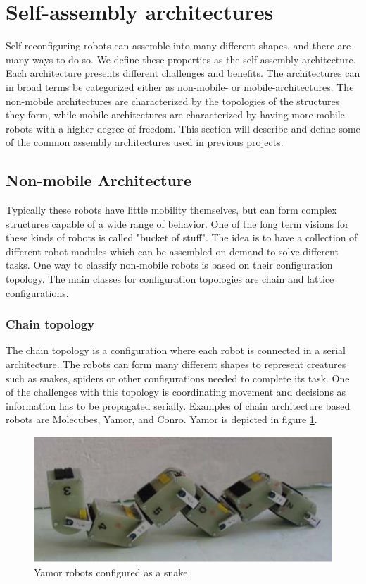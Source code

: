 \section{Self-assembly architectures}
\label{sec:sfArchitecture}
Self reconfiguring robots can assemble into many different shapes, and there are many ways to do so.
We define these properties as the self-assembly architecture.
Each architecture presents different challenges and benefits.
The architectures can in broad terms be categorized either as non-mobile- or mobile-architectures.
The non-mobile architectures are characterized by the topologies of the structures they form, while mobile architectures are characterized by having more mobile robots with a higher degree of freedom.
This section will describe and define some of the common assembly architectures used in previous projects.
\subsection{Non-mobile Architecture}
Typically these robots have little mobility themselves, but can form complex structures capable of a wide range of behavior.
One of the long term visions for these kinds of robots is called "bucket of stuff"\cite{yim_modular_2007}.
The idea is to have a collection of different robot modules which can be assembled on demand to solve different tasks.
One way to classify non-mobile robots is based on their configuration topology.
The main classes for configuration topologies are chain and lattice configurations.

\subsubsection{Chain topology}
The chain topology is a configuration where each robot is connected in a serial architecture.
The robots can form many different shapes to represent creatures such as snakes, spiders or other configurations needed to complete its task.
One of the challenges with this topology is coordinating movement and decisions as information has to be propagated serially.
Examples of chain architecture based robots are Molecubes\cite{zykov_molecubes:_2007}, Yamor\cite{mockel_yamor_2006}, and Conro\cite{castano_conro:_2000}.
Yamor is depicted in figure \ref{fig:yamor}.

\begin{figure}[H]	
	\centering
	\includegraphics[scale=0.5]{chapters/res/Yamor.PNG}
	\caption{Yamor robots configured as a snake\cite{mockel_yamor_2006}.}
	\label{fig:yamor}
\end{figure}

